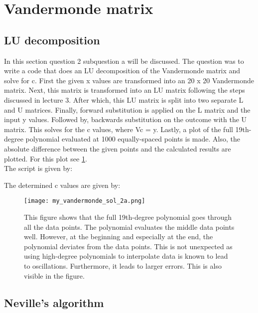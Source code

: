 \section{Vandermonde matrix}

\subsection{LU decomposition}

In this section question 2 subquestion a will be discussed. The question was to write a code that does an LU decomposition of the Vandermonde matrix and solve for c. First the given x values are transformed into an 20 x 20 Vandermonde matrix. Next, this matrix is transformed into an LU matrix following the steps discussed in lecture 3. After which, this LU matrix is split into two separate L and U matrices. Finally, forward substitution is applied on the L matrix and the input y values. Followed by, backwards substitution on the outcome with the U matrix. This solves for the c values, where Vc = y. Lastly, a plot of the full 19th-degree polynomial evaluated at 1000 equally-spaced points is made. Also, the absolute difference between the given points and the calculated results are plotted. For this plot see \ref{fig:2a}. \\

The script is given by:


The determined c values are given by:


\begin{figure}[h!]
  \centering
  \texttt{[image: my\_vandermonde\_sol\_2a.png]}
  \caption{This figure shows that the full 19th-degree polynomial goes through all the data points. The polynomial evaluates the middle data points well. However, at the beginning and especially at the end, the polynomial deviates from the data points. This is not unexpected as using high-degree polynomials to interpolate data is known to lead to oscillations. Furthermore, it leads to larger errors. This is also visible in the figure.}
  \label{fig:2a}
\end{figure}

\subsection{Neville's algorithm}


